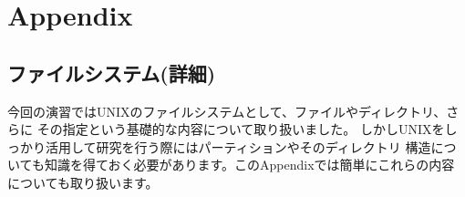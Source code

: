 \documentclass[platex]{jsarticle}
\begin{document}

\newpage
\section{Appendix}
 \subsection{ファイルシステム(詳細)}
 今回の演習ではUNIXのファイルシステムとして、ファイルやディレクトリ、さらに
 その指定という基礎的な内容について取り扱いました。
 しかしUNIXをしっかり活用して研究を行う際にはパーティションやそのディレクトリ
 構造についても知識を得ておく必要があります。このAppendixでは簡単にこれらの内容
 についても取り扱います。
\end{document}
